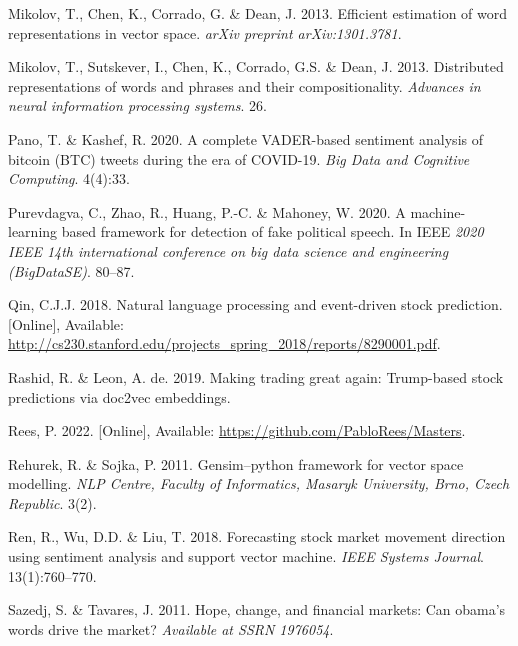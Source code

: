 \documentclass[11pt,preprint, authoryear]{elsarticle}
\numberwithin{equation}{section}
\numberwithin{figure}{section}
\numberwithin{table}{section}
\newlength{\cslhangindent}
\newenvironment{CSLReferences}%
  {\setlength{\parindent}{0pt}%
  \everypar{\setlength{\hangindent}{\cslhangindent}}\ignorespaces}%
  {\par}
\begin{document}
\begin{CSLReferences}{1}{0}
\leavevmode{}%
Mikolov, T., Chen, K., Corrado, G. \& Dean, J. 2013. Efficient
estimation of word representations in vector space. \emph{arXiv preprint
arXiv:1301.3781}.

\leavevmode{}%
Mikolov, T., Sutskever, I., Chen, K., Corrado, G.S. \& Dean, J. 2013.
Distributed representations of words and phrases and their
compositionality. \emph{Advances in neural information processing
systems}. 26.

\leavevmode{}%
Pano, T. \& Kashef, R. 2020. A complete VADER-based sentiment analysis
of bitcoin (BTC) tweets during the era of COVID-19. \emph{Big Data and
Cognitive Computing}. 4(4):33.

\leavevmode{}%
Purevdagva, C., Zhao, R., Huang, P.-C. \& Mahoney, W. 2020. A
machine-learning based framework for detection of fake political speech.
In IEEE \emph{2020 IEEE 14th international conference on big data
science and engineering (BigDataSE)}. 80--87.

\leavevmode{}%
Qin, C.J.J. 2018. Natural language processing and event-driven stock
prediction. {[}Online{]}, Available:
\url{http://cs230.stanford.edu/projects_spring_2018/reports/8290001.pdf}.

\leavevmode{}%
Rashid, R. \& Leon, A. de. 2019. Making trading great again: Trump-based
stock predictions via doc2vec embeddings.

\leavevmode{}%
Rees, P. 2022. {[}Online{]}, Available:
\url{https://github.com/PabloRees/Masters}.

\leavevmode{}%
Rehurek, R. \& Sojka, P. 2011. Gensim--python framework for vector space
modelling. \emph{NLP Centre, Faculty of Informatics, Masaryk University,
Brno, Czech Republic}. 3(2).

\leavevmode{}%
Ren, R., Wu, D.D. \& Liu, T. 2018. Forecasting stock market movement
direction using sentiment analysis and support vector machine.
\emph{IEEE Systems Journal}. 13(1):760--770.

\leavevmode{}%
Sazedj, S. \& Tavares, J. 2011. Hope, change, and financial markets: Can
obama's words drive the market? \emph{Available at SSRN 1976054}.


\end{CSLReferences}
\end{document}
